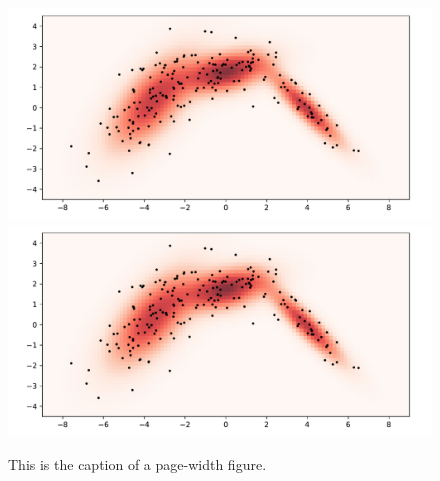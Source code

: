 \documentclass[10pt,twocolumn,letterpaper]{article}
\begin{document}
\begin{figure}
   \begin{center}
      \includegraphics[width=0.4\linewidth]{sample_image.pdf}
      \includegraphics[width=0.4\linewidth]{sample_image.pdf}
   \end{center}
      \caption{This is the caption of a page-width figure.\label{second_figure}}
\end{figure}





\printbibliography[heading=bibintoc]
\end{document}
